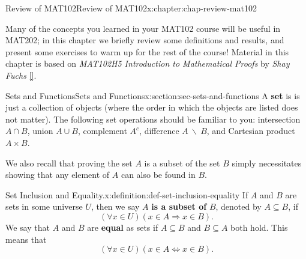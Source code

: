 \documentclass[oneside,10pt,]{book}
\newcommand{\xreffont}{\relax}
\newcommand{\terminology}[1]{\textbf{#1}}
\newcommand{\pubtitle}[1]{\textsl{#1}}
\numberwithin{equation}{section}
\begin{document}
\setcounter{tocdepth}{1}
\renewcommand*\contentsname{Contents}
\tableofcontents
\mainmatter
%
%
\typeout{************************************************}
\typeout{************************************************}
%
\begin{chapterptx}{Review of MAT102}{}{Review of MAT102}{}{}{x:chapter:chap-review-mat102}
\begin{introduction}{}%
Many of the concepts you learned in your MAT102 course will be useful in MAT202; in this chapter we briefly review some definitions and results, and present some exercises to warm up for the rest of the course! Material in this chapter is based on \pubtitle{MAT102H5 Introduction to Mathematical Proofs} by \emph{Shay Fuchs} \hyperlink{x:biblio:bib-fuchs-102}{[{\xreffont 3}]}.%
\end{introduction}%
%
%
\typeout{************************************************}
\typeout{************************************************}
%
\begin{sectionptx}{Sets and Functions}{}{Sets and Functions}{}{}{x:section:sec-sets-and-functions}
A \terminology{set} is is just a collection of objects (where the order in which the objects are listed does not matter). The following set operations should be familiar to you: intersection \(A \cap B\), union \(A \cup B\), complement \(A^c\), difference \(A \ \backslash \ B\), and Cartesian product \(A \times B\).%
\par
We also recall that proving the set \(A\) is a subset of the set \(B\) simply necessitates showing that any element of \(A\) can also be found in \(B\).%
\begin{definition}{Set Inclusion and Equality.}{x:definition:def-set-inclusion-equality}%
\label{g:notation:id523587} If \(A\) and \(B\) are sets in some universe \(U\), then we say \(A\) \terminology{is a subset of} \(B\), denoted by \(A \subseteq B\), if%
\begin{equation*}
(\forall x \in U)(x \in A \Rightarrow x \in B)\text{.}
\end{equation*}
We say that \(A\) and \(B\) are \terminology{equal} as sets if \(A \subseteq B\) and \(B \subseteq A\) both hold. This means that%
\begin{equation*}
(\forall x \in U)(x \in A \Leftrightarrow x \in B)\text{.}
\end{equation*}
%
\end{definition}

\end{sectionptx}
\end{chapterptx}
\end{document}
